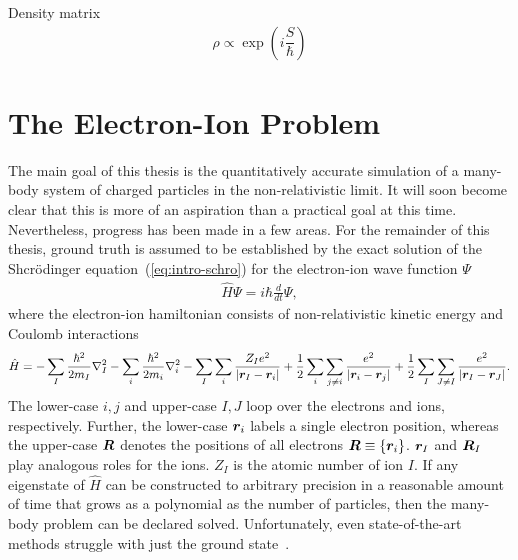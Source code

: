 Density matrix
\begin{align}
\rho\propto\exp\left(i\dfrac{S}{\hbar}\right)
\end{align}

\section{The Electron-Ion Problem}
The main goal of this thesis is the quantitatively accurate simulation of a many-body system of charged particles in the non-relativistic limit.
It will soon become clear that this is more of an aspiration than a practical goal at this time.
Nevertheless, progress has been made in a few areas.
For the remainder of this thesis, ground truth is assumed to be established by the exact solution of the Shcr\"odinger equation~(\ref{eq:intro-schro}) for the electron-ion wave function $\Psi$
\begin{align} \label{eq:intro-schro}
\hat{H} \Psi = i\hbar\frac{d}{dt}\Psi,
\end{align}
where the electron-ion hamiltonian consists of non-relativistic kinetic energy and Coulomb interactions
\begin{align} \label{eq:intro-ei-ham}
\hat{H} =
-\sum_I \frac{\hbar^2}{2m_I} \nabla^2_I 
-\sum_i \frac{\hbar^2}{2m_i}\nabla^2_i
-\sum_I\sum_i\frac{Z_Ie^2}{\vert\boldsymbol{r}_I-\boldsymbol{r}_i\vert}
+\frac{1}{2}\sum_i\sum_{j\neq i} \frac{e^2}{\vert\boldsymbol{r}_i-\boldsymbol{r}_j\vert}
+\frac{1}{2}\sum_I\sum_{J\neq I} \frac{e^2}{\vert\boldsymbol{r}_I-\boldsymbol{r}_J\vert}.
\end{align}
The lower-case $i,j$ and upper-case $I,J$ loop over the electrons and ions, respectively. Further, the lower-case $\boldsymbol{r}_i$ labels a single electron position, whereas the upper-case $\boldsymbol{R}$ denotes the positions of all electrons $\boldsymbol{R}\equiv\{\boldsymbol{r}_i\}$. $\boldsymbol{r}_I$ and $\boldsymbol{R}_I$ play analogous roles for the ions. $Z_I$ is the atomic number of ion $I$. If any eigenstate of $\hat{H}$ can be constructed to arbitrary precision in a reasonable amount of time that grows as a polynomial as the number of particles, then the many-body problem can be declared solved. Unfortunately, even state-of-the-art methods struggle with just the ground state~\cite{Azadi2014,McMinis2015,Drummond2015}.

